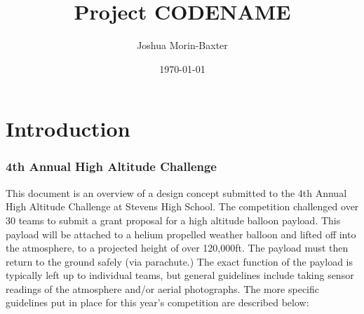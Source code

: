 \documentclass[english]{report}
\title{Project CODENAME}
\author{Joshua Morin-Baxter}
\date{\today}
\begin{document}
\newcommand{\amountofheliumtobeused}{142 }

\maketitle

\tableofcontents

\begin{appendix}
  \listoffigures
  \listoftables
\end{appendix}


\part{Introduction}

\section{4th Annual High Altitude Challenge}
This document is an overview of a design concept submitted to the
4th Annual High Altitude Challenge at Stevens High School. The competition
challenged over 30 teams to submit a grant proposal for a high altitude
balloon payload. This payload will be attached to a helium propelled weather balloon and lifted off into the atmosphere, to a projected height of over 120,000ft.  The payload must then return to the ground safely (via parachute.)  The exact function of the payload is typically left up to individual teams, but general guidelines include taking sensor readings of the atmosphere and/or aerial photographs.  The more specific guidelines put in place for this year's competition are described below:
\end{document}
